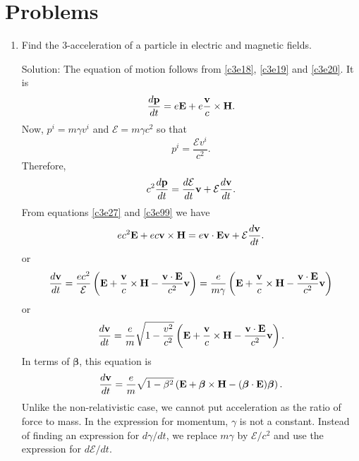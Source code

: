 \section{Problems}
\begin{enumerate}
\item Find the 3-acceleration of a particle in electric and magnetic fields.
\item[Solution:] The equation of motion follows from \eqref{c3e18}, \eqref{c3e19}
and \eqref{c3e20}. It is
\begin{equation}\label{c3e100}
\frac{d{\mathbf{p}}}{d{t}} = e\mathbf{E} + e\frac{\mathbf{v}}{c}\times\mathbf{H}.
\end{equation}
Now, $p^i = m\gamma v^i$ and $\mathcal{E} = m\gamma c^2$ so that 
\[
p^i = \frac{\mathcal{E} v^i}{c^2}.
\]
Therefore,
\[
c^2\frac{d{\mathbf{p}}}{d{t}} = \frac{d{\mathcal{E}}}{d{t}}\mathbf{v} + \mathcal{E}\frac{d{\mathbf{v}}}{d{t}}.
\]
From equations \eqref{c3e27} and \eqref{c3e99} we have
\[
ec^2\mathbf{E} + ec\mathbf{v}\times\mathbf{H} = e\mathbf{v}\cdot\mathbf{E}\mathbf{v} + \mathcal{E}\frac{d{\mathbf{v}}}{d{t}}.
\]
or
\[
\frac{d{\mathbf{v}}}{d{t}} = \frac{ec^2}{\mathcal{E}}
\left(\mathbf{E} + \frac{\mathbf{v}}{c}\times\mathbf{H} - \frac{\mathbf{v}\cdot\mathbf{E}}{c^2}\mathbf{v}\right)
= \frac{e}{m\gamma}
\left(\mathbf{E} + \frac{\mathbf{v}}{c}\times\mathbf{H} - \frac{\mathbf{v}\cdot\mathbf{E}}{c^2}\mathbf{v}\right)
\]
or
\begin{equation}\label{c3e101}
\frac{d{\mathbf{v}}}{d{t}} = \frac{e}{m}\sqrt{1 - \frac{v^2}{c^2}}
\left(\mathbf{E} + \frac{\mathbf{v}}{c}\times\mathbf{H} - \frac{\mathbf{v}\cdot\mathbf{E}}{c^2}\mathbf{v}\right).
\end{equation}
In terms of $\bm{\beta}$, this equation is
\begin{equation}\label{c3e102}
\frac{d{\mathbf{v}}}{d{t}} = \frac{e}{m}\sqrt{1 - \beta^2}
\left(\mathbf{E} + \bm{\beta}\times\mathbf{H} - (\bm{\beta}\cdot\mathbf{E})\bm{\beta}\right).
\end{equation}
Unlike the non-relativistic case, we cannot put acceleration as the ratio of 
force to mass. In the expression for momentum, $\gamma$ is not a constant. Instead of
finding an expression for $d\gamma/dt$, we replace $m\gamma$ by $\mathcal{E}/c^2$
and use the expression for $d\mathcal{E}/dt$.


\end{enumerate}
